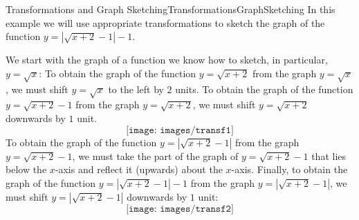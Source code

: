 \begin{example}{Transformations and Graph Sketching}{TransformationsGraphSketching}
In this example we will use appropriate transformations to sketch the graph of the function $y=|\sqrt{x+2}-1|-1$.
\end{example}
\begin{solution} 
We start with the graph of a function we know how to sketch, in particular, $y=\sqrt{x}$:
To obtain the graph of the function $y=\sqrt{x+2}$ from the graph $y=\sqrt{x}$, we must shift $y=\sqrt{x}$ to the left by $2$ units.
To obtain the graph of the function $y=\sqrt{x+2}-1$ from the graph $y=\sqrt{x+2}$, we must shift $y=\sqrt{x+2}$ downwards by $1$ unit.
$$\texttt{[image: images/transf1]}$$
To obtain the graph of the function $y=|\sqrt{x+2}-1|$ from the graph $y=\sqrt{x+2}-1$, we must take the part of the graph of $y=\sqrt{x+2}-1$ that lies below the $x$-axis and reflect it (upwards) about the $x$-axis.
Finally, to obtain the graph of the function $y=|\sqrt{x+2}-1|-1$ from the graph $y=|\sqrt{x+2}-1|$, we must shift $y=|\sqrt{x+2}-1|$ downwards by $1$ unit:
$$\texttt{[image: images/transf2]}$$
\end{solution}